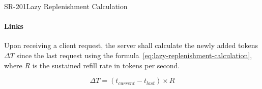 \begin{softwarerequirement}{SR-201}{Lazy Replenishment Calculation}
\paragraph{Links} 

Upon receiving a client request,
the server shall calculate the newly added tokens $\Delta T$ since the last request
using the formula~\ref{eq:lazy-replenishment-calculation},
where $R$ is the sustained refill rate in tokens per second.

\begin{equation}
    \Delta T = (t_{current} - t_{last}) \times R
    \label{eq:lazy-replenishment-calculation}
\end{equation}
\end{softwarerequirement}